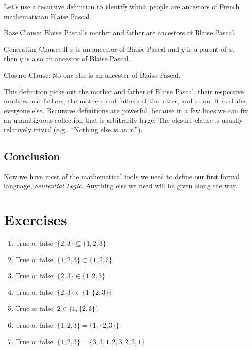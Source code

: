 Let's use a recursive definition to identify which people are ancestors of French mathematician Blaise Pascal.

\begin{cenumerate}
	\item Base Clause: Blaise Pascal's mother and father are ancestors of Blaise Pascal.
	\item Generating Clause: If $x$ is an ancestor of Blaise Pascal and $y$ is a parent of $x$, then $y$ is also an ancestor of Blaise Pascal.
	\item Closure Clause: No one else is an ancestor of Blaise Pascal.
\end{cenumerate}
\noindent{}This definition picks out the mother and father of Blaise Pascal, their respective mothers and fathers, the mothers and fathers of the latter, and so on.  It excludes everyone else. Recursive definitions are powerful, because in a few lines we can fix an unambiguous collection that is arbitrarily large. The closure clause is usually relatively trivial (e.g., ``Nothing else is an $x$.'').

\subsection{Conclusion}\label{Conclusion}

Now we have most of the mathematical tools we need to define our first formal language, \emph{Sentential Logic}. Anything else we need will be given along the way.

\section{Exercises}


\begin{enumerate}
	\item True or false: $\{2, 3\}\subseteq\{1, 2, 3\}$
    \item True or false: $\{1, 2, 3\}\subset\{1, 2, 3\}$
	\item True or false: $\{2, 3\}\in\{1, 2, 3\}$
    \item True or false: $\{2, 3\}\in\{1, \{2, 3\}\}$
    \item True or false: $2\in\{1, \{2, 3\}\}$
    \item True or false: $\{1, 2, 3\}=\{1, \{2, 3\}\}$
    \item True or false: $\{1, 2, 3\}=\{3, 3, 1, 2, 3, 2, 2, 1\}$
\end{enumerate}

